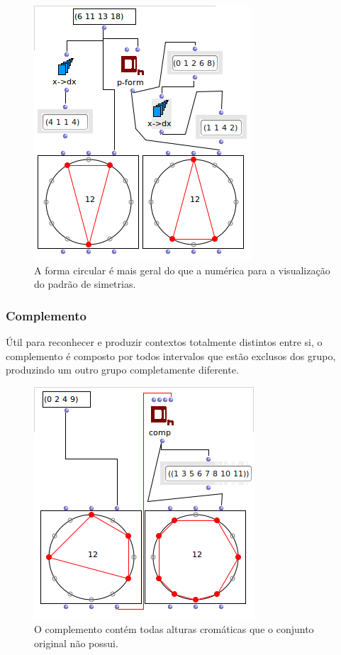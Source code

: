 \documentclass[
	12pt,				%
	openright,			%
	twoside,			%
	a4paper,			%
	english,			%
	french,				%
	spanish,			%
	brazil				%
	]{abntex2}
\begin{document}
\begin{figure}[!h]
	\caption{\label{fig_grafico}A forma circular é mais geral do que a numérica para a visualização do padrão de simetrias. }
	\begin{center}
	    \includegraphics[scale=0.6]{OM_settheory/palindrome2.png}
	\end{center}
\end{figure}



\subsubsection{Complemento}

Útil para reconhecer e produzir contextos totalmente distintos entre si, o complemento é composto por todos intervalos que estão exclusos dos grupo, produzindo um outro grupo completamente diferente.


\begin{figure}[!h]
	\caption{\label{fig_grafico}O complemento contém todas alturas cromáticas que o conjunto original não possui. }
	\begin{center}
	    \includegraphics[scale=0.6]{OM_settheory/complemento.png}
	\end{center}
\end{figure}
\end{document}
